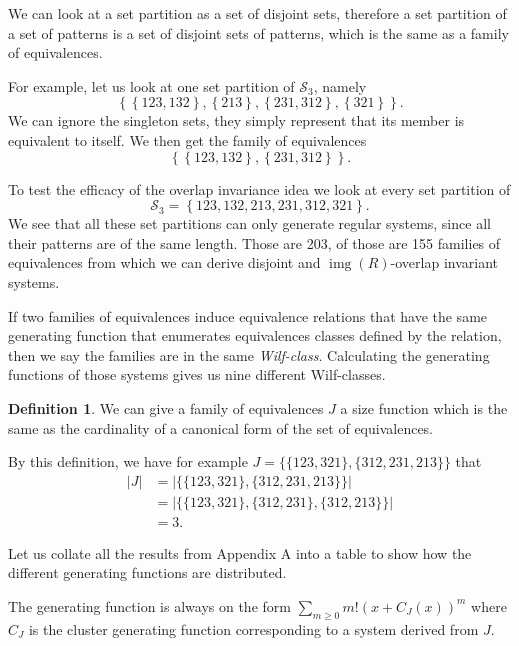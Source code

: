 \documentclass[a4paper, 11pt, english]{article}
\theoremstyle{definition}
\newtheorem{definition}[theorem]{Definition}
\newcommand{\Sym}{\mathcal{S}}
\DeclareMathOperator{\img}{img}
\begin{document}
We can look at a set partition as a set of disjoint sets, therefore a set partition of a set of
patterns is a set of disjoint sets of patterns, which is the same as a family of
equivalences.

For example, let us look at one set partition of $\Sym_3$, namely 
\[
  \left\{ \left\{ 123, 132 \right\}, \left\{ 213 \right\}, \left\{ 231, 312 \right\}, \left\{ 321
  \right\} \right\}.
\]
We can ignore the singleton sets, they simply represent that its member is equivalent to itself. We
then get the family of equivalences
\[
  \left\{ \left\{ 123, 132 \right\}, \left\{ 231, 312 \right\} \right\}.
\]

To test the efficacy of the overlap invariance idea we look at every set partition of 
\[
  \Sym_3 = \left\{ 123, 132, 213, 231, 312, 321 \right\}.
\]
We see that all these set partitions can only generate regular systems, since all their patterns are of
the same length.
Those are 203, of those are 155 families of equivalences from which we can derive disjoint and
$\img(R)$-overlap invariant systems. 

If two families of equivalences induce equivalence relations that have the same generating function
that enumerates equivalences classes defined by the relation,
then we say the families are in the same \emph{Wilf-class}.
Calculating the generating functions of those systems gives us nine different Wilf-classes.

\begin{definition}
    We can give a family of equivalences $J$ a size function which is the same
    as the cardinality of a canonical form of the set of equivalences.

    By this definition, we have for example $J=\{ \{ 123, 321 \}, \{ 312, 231, 213 \} \}$ that
    \begin{align*}
      |J| & = \left| \{ \{ 123, 321 \}, \{ 312, 231, 213 \} \} \right| \\
         & = \left| \{ \{ 123, 321 \}, \{ 312, 231 \}, \{ 312, 213 \} \} \right| \\
         & = 3.
    \end{align*}
\end{definition}

Let us collate all the results from Appendix A into a table to show how the
different generating functions are distributed.

The generating function is always on the form $\sum_{m \geq 0}m!(x+C_J(x))^m$ where $C_J$
is the cluster generating function corresponding to a system derived from $J$.
\end{document}
